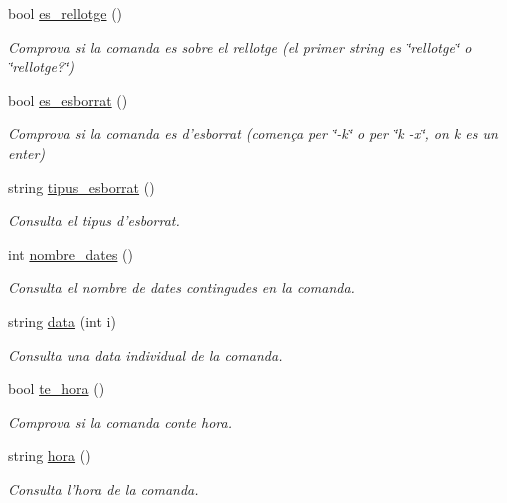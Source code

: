 \begin{DoxyCompactItemize}
bool \hyperlink{class_comanda_aa8767f298317c3bb07f90676cabb8c43}{es\-\_\-rellotge} ()
\begin{DoxyCompactList}\small\item\em Comprova si la comanda es sobre el rellotge (el primer string es \char`\"{}rellotge\char`\"{} o \char`\"{}rellotge?\char`\"{}) \end{DoxyCompactList}\item 
bool \hyperlink{class_comanda_a9e71320e8617ce224c8d994d0969555a}{es\-\_\-esborrat} ()
\begin{DoxyCompactList}\small\item\em Comprova si la comanda es d'esborrat (comença per \char`\"{}-\/k\char`\"{} o per \char`\"{}k -\/x\char`\"{}, on k es un enter) \end{DoxyCompactList}\item 
string \hyperlink{class_comanda_a998dc172668a108837512f818ca5430f}{tipus\-\_\-esborrat} ()
\begin{DoxyCompactList}\small\item\em Consulta el tipus d'esborrat. \end{DoxyCompactList}\item 
int \hyperlink{class_comanda_aadabfc85ec7cdeb45039e8952a1ab124}{nombre\-\_\-dates} ()
\begin{DoxyCompactList}\small\item\em Consulta el nombre de dates contingudes en la comanda. \end{DoxyCompactList}\item 
string \hyperlink{class_comanda_ab4ce0a50bde32145d11cbaee753526c7}{data} (int i)
\begin{DoxyCompactList}\small\item\em Consulta una data individual de la comanda. \end{DoxyCompactList}\item 
bool \hyperlink{class_comanda_abf8b926146f3664aacfd24d7800014e5}{te\-\_\-hora} ()
\begin{DoxyCompactList}\small\item\em Comprova si la comanda conte hora. \end{DoxyCompactList}\item 
string \hyperlink{class_comanda_ae8bca2ad702d3316dc1c53dcab7cac02}{hora} ()
\begin{DoxyCompactList}\small\item\em Consulta l'hora de la comanda. \end{DoxyCompactList}\item 

\end{DoxyCompactItemize}
